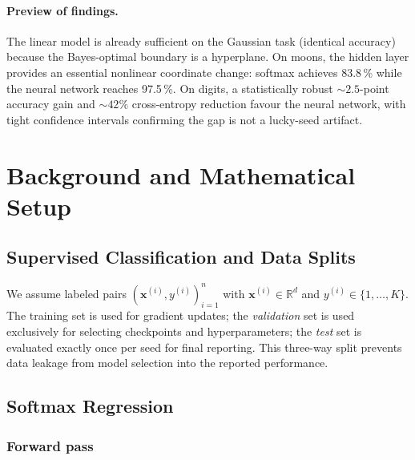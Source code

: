 \documentclass[sigconf,screen,nonacm]{acmart}
\newcommand{\R}{\mathbb{R}}
\newcommand{\1}{\mathbf{1}}
\newcommand{\vx}{\mathbf{x}}
\begin{document}
\paragraph{Preview of findings.}
The linear model is already sufficient on the Gaussian task (identical accuracy)
because the Bayes-optimal boundary is a hyperplane.  On moons, the hidden layer
provides an essential nonlinear coordinate change: softmax achieves 83.8\,\%
while the neural network reaches 97.5\,\%.  On digits, a statistically robust
${\sim}2.5$-point accuracy gain and ${\sim}42\%$ cross-entropy reduction favour
the neural network, with tight confidence intervals confirming the gap is not
a lucky-seed artifact.

\section{Background and Mathematical Setup}
\label{sec:background}

\subsection{Supervised Classification and Data Splits}

We assume labeled pairs $(\vx^{(i)}, y^{(i)})_{i=1}^{n}$ with $\vx^{(i)}\in\R^d$
and $y^{(i)}\in\{1,\dots,K\}$.  The training set is used for gradient updates;
the \emph{validation} set is used exclusively for selecting checkpoints and
hyperparameters; the \emph{test} set is evaluated exactly once per seed for
final reporting.  This three-way split prevents data leakage from model
selection into the reported performance.

\subsection{Softmax Regression}
\label{sec:softmax}

\subsubsection*{Forward pass}
\end{document}
